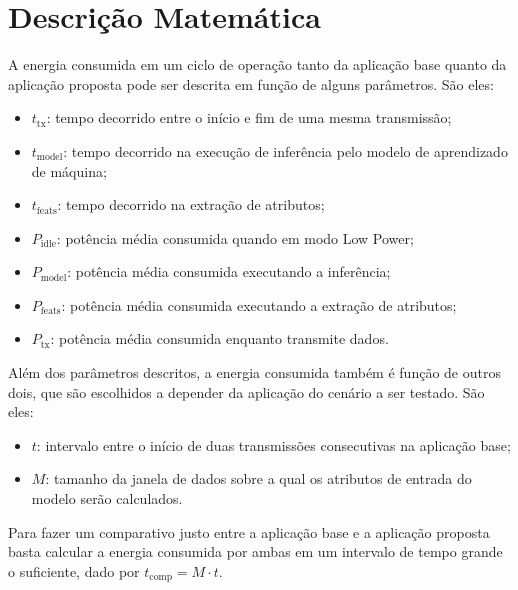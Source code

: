 \documentclass[a5paper]{ufsc-thesis}  %
\begin{document}
\section{Descrição Matemática}
A energia consumida em um ciclo de operação tanto da aplicação base quanto da aplicação proposta pode ser descrita em função de alguns parâmetros. São eles:
\begin{itemize}
    \item $t_{\text{tx}}$: tempo decorrido entre o início e fim de uma mesma transmissão;
    \item $t_{\text{model}}$: tempo decorrido na execução de inferência pelo modelo de aprendizado de máquina;
    \item $t_{\text{feats}}$: tempo decorrido na extração de atributos;
    \item $P_{\text{idle}}$: potência média consumida quando em modo Low Power;
    \item $P_{\text{model}}$: potência média consumida executando a inferência;
    \item $P_{\text{feats}}$: potência média consumida executando a extração de atributos;
    \item $P_{\text{tx}}$: potência média consumida enquanto transmite dados.
\end{itemize}

Além dos parâmetros descritos, a energia consumida também é função de outros dois, que são escolhidos a depender da aplicação do cenário a ser testado. São eles:
\begin{itemize}
    \item $t$: intervalo entre o início de duas transmissões consecutivas na aplicação base;
    \item $M$: tamanho da janela de dados sobre a qual os atributos de entrada do modelo serão calculados.
\end{itemize}

Para fazer um comparativo justo entre a aplicação base e a aplicação proposta basta calcular a energia consumida por ambas em um intervalo de tempo grande o suficiente, dado por $t_{\text{comp}} = M \cdot t$.
\end{document}
